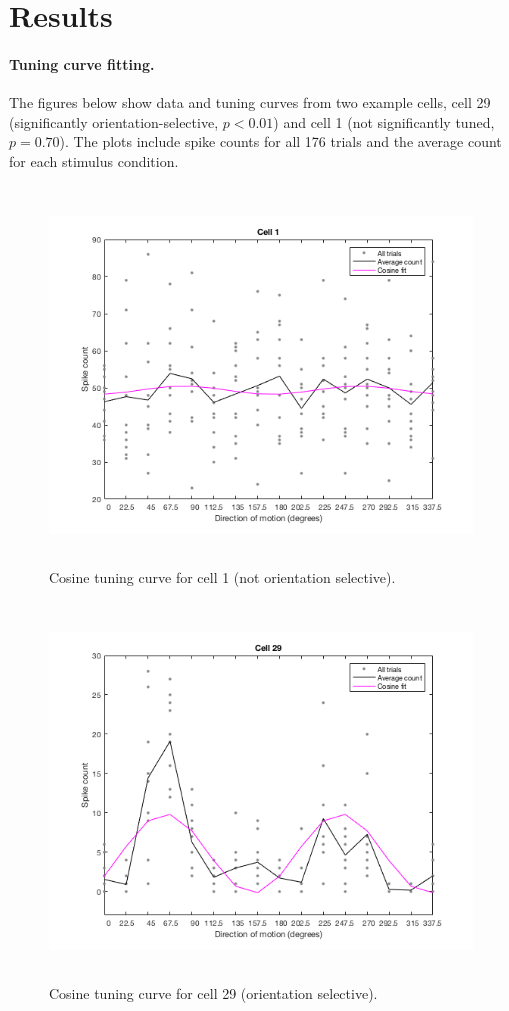 \documentclass[10pt]{article}
\begin{document}
\section*{Results}
 
\paragraph{Tuning curve fitting.} The figures below show data and tuning curves from two example cells, cell 29 (significantly orientation-selective, $p<0.01$) and cell 1 (not significantly tuned, $p=0.70$). The plots include spike counts for all 176 trials and the average count for each stimulus condition.

\newpage

\begin{figure}[!h]
\centering
\includegraphics[height=10cm]{fitCosCell1.png}
\caption{Cosine tuning curve for cell 1 (not orientation selective).
\label{fitCos1}}
\end{figure}

\begin{figure}[!h]
\centering
\includegraphics[height=10cm]{fitCos.png}
\caption{Cosine tuning curve for cell 29 (orientation selective).
\label{fitCos29}}
\end{figure}
\end{document}
